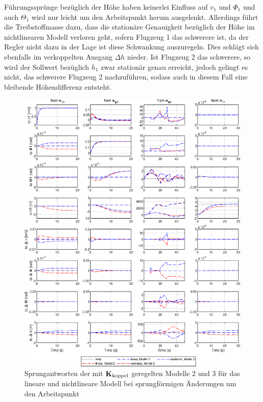 Führungssprünge bezüglich der Höhe haben keinerlei Einfluss auf $v_1$ und $\Phi_1$ und auch $\Theta_1$ wird nur leicht um den Arbeitspunkt herum ausgelenkt. Allerdings führt die Treibstoffmasse dazu, dass die stationäre Genauigkeit bezüglich der Höhe im nichtlinearen Modell verloren geht, sofern Flugzeug 1 das schwerere ist, da der Regler nicht dazu in der Lage ist diese Schwankung auszuregeln. Dies schlägt sich ebenfalls im verkoppelten Ausgang $\Delta h $ nieder. Ist Flugzeug 2 das schwerere, so wird der Sollwert bezüglich $h_1$ zwar stationär genau erreicht, jedoch gelingt es nicht, das schwerere Flugzeug 2 nachzuführen, sodass auch in diesem Fall eine bleibende Höhendifferenz entsteht. 
\begin{figure}[H] %
	\centering
	\includegraphics[width=\linewidth]{./Bilder/outputs_lin_nlin_two_masses_um_AP.eps}
	\caption{Sprungantworten der mit ${\boldsymbol{\mathrm{K}}}_{\textnormal{koppel}}$ geregelten Modelle 2 und 3 für das lineare und nichtlineare Modell bei sprungförmigen Änderungen um den Arbeitspunkt}
	\label{fig:outputs_linear_nlinear_two_masses}
\end{figure}
